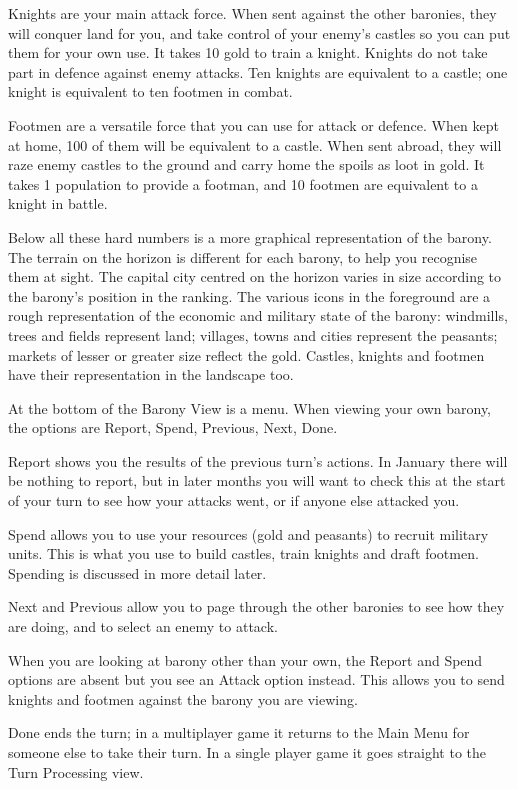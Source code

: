 \documentclass[8pt]{extarticle}
\begin{document}
\begin{multicols}{2}
Knights are your main attack force. When sent against the other baronies, they will conquer land for you, and take control of your enemy's castles so you can put them for your own use. It takes 10 gold to train a knight. Knights do not take part in defence against enemy attacks. Ten knights are equivalent to a castle; one knight is equivalent to ten footmen in combat.

Footmen are a versatile force that you can use for attack or defence. When kept at home, 100 of them will be equivalent to a castle. When sent abroad, they will raze enemy castles to the ground and carry home the spoils as loot in gold. It takes 1 population to provide a footman, and 10 footmen are equivalent to a knight in battle.

Below all these hard numbers is a more graphical representation of the barony. The terrain on the horizon is different for each barony, to help you recognise them at sight. The capital city centred on the horizon varies in size according to the barony's position in the ranking. The various icons in the foreground are a rough representation of the economic and military state of the barony: windmills, trees and fields represent land; villages, towns and cities represent the peasants; markets of lesser or greater size reflect the gold. Castles, knights and footmen have their representation in the landscape too.

At the bottom of the Barony View is a menu. When viewing your own barony, the options are Report, Spend, Previous, Next, Done.

Report shows you the results of the previous turn's actions. In January there will be nothing to report, but in later months you will want to check this at the start of your turn to see how your attacks went, or if anyone else attacked you.

Spend allows you to use your resources (gold and peasants) to recruit military units. This is what you use to build castles, train knights and draft footmen. Spending is discussed in more detail later.

Next and Previous allow you to page through the other baronies to see how they are doing, and to select an enemy to attack.

When you are looking at barony other than your own, the Report and Spend options are absent but you see an Attack option instead. This allows you to send knights and footmen against the barony you are viewing.

Done ends the turn; in a multiplayer game it returns to the Main Menu for someone else to take their turn. In a single player game it goes straight to the Turn Processing view.
\end{multicols}
\end{document}
